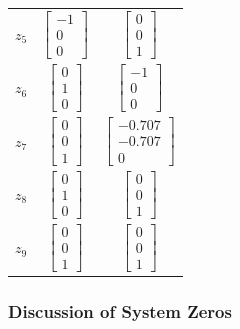 \begin{table}[H]
\begin{tabular}{ccc}
		$z_5$            &$ \begin{bmatrix} -1 \\ 0 \\ 0\end{bmatrix} $ & $ \begin{bmatrix} 0 \\ 0 \\ 1\end{bmatrix} $ \\
		$z_6$            &$ \begin{bmatrix} 0 \\ 1 \\ 0\end{bmatrix} $ & $ \begin{bmatrix} -1 \\ 0 \\ 0\end{bmatrix} $ \\
		$z_7$            &$ \begin{bmatrix} 0 \\ 0 \\ 1\end{bmatrix} $ & $ \begin{bmatrix} -0.707 \\ -0.707 \\ 0\end{bmatrix} $ \\
		$z_8$            &$ \begin{bmatrix} 0 \\ 1 \\ 0\end{bmatrix} $ & $ \begin{bmatrix} 0 \\ 0 \\ 1\end{bmatrix} $ \\
		$z_9$            &$ \begin{bmatrix} 0 \\ 0 \\ 1\end{bmatrix} $ & $ \begin{bmatrix} 0 \\ 0 \\ 1\end{bmatrix} $ \\\hline             
	\end{tabular}
	\label{tab: Zero Directions of system}
\end{table}

\subsubsection{Discussion of System Zeros}

